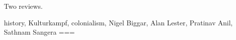 Two reviews.

history, Kulturkampf, colonialism, Nigel Biggar, Alan Lester, Pratinav Anil, Sathnam Sangera
===
\nocite{anil2024}
\nocite{lester2023}